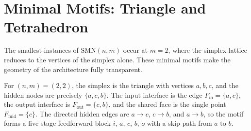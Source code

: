 \section{Minimal Motifs: Triangle and Tetrahedron}
\label{sec:motifs}

The smallest instances of $\mathrm{SMN}(n,m)$ occur at $m=2$, where the simplex lattice reduces to the vertices of the simplex alone.  These minimal motifs make the geometry of the architecture fully transparent.

For $(n,m)=(2,2)$, the simplex is the triangle with vertices $a,b,c$, and the hidden nodes are precisely $\{a,c,b\}$.  The input interface is the edge $F_{\mathrm{in}}=\{a,c\}$, the output interface is $F_{\mathrm{out}}=\{c,b\}$, and the shared face is the single point $F_{\mathrm{mid}}=\{c\}$.  The directed hidden edges are $a\to c$, $c\to b$, and $a\to b$, so the motif forms a five-stage feedforward block $i,\,a,\,c,\,b,\,o$ with a skip path from $a$ to $b$.

